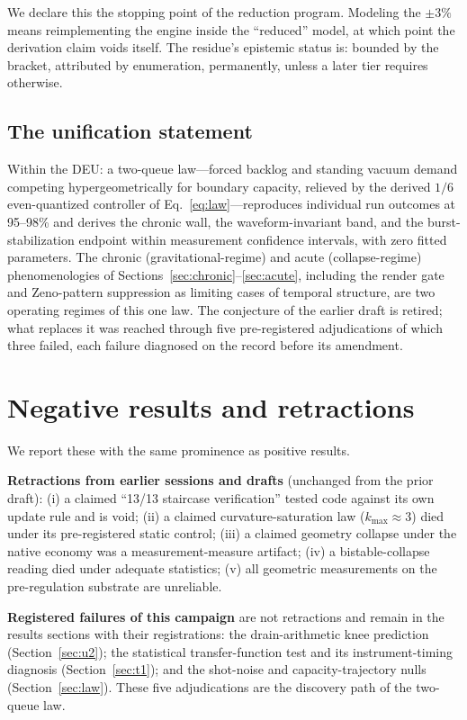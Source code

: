 \documentclass[11pt]{article}
\begin{document}
We declare this the stopping point of the reduction program. Modeling the
$\pm3\%$ means reimplementing the engine inside the ``reduced'' model, at
which point the derivation claim voids itself. The residue's epistemic status
is: bounded by the bracket, attributed by enumeration, permanently, unless a
later tier requires otherwise.

\subsection{The unification statement}
Within the DEU: a two-queue law---forced backlog and standing vacuum demand
competing hypergeometrically for boundary capacity, relieved by the derived
$1/6$ even-quantized controller of Eq.~\ref{eq:law}---reproduces individual
run outcomes at 95--98\% and derives the chronic wall, the waveform-invariant
band, and the burst-stabilization endpoint within measurement confidence
intervals, with zero fitted parameters. The chronic (gravitational-regime)
and acute (collapse-regime) phenomenologies of
Sections~\ref{sec:chronic}--\ref{sec:acute}, including the render gate and
Zeno-pattern suppression as limiting cases of temporal structure, are two
operating regimes of this one law. The conjecture of the earlier draft is
retired; what replaces it was reached through five pre-registered
adjudications of which three failed, each failure diagnosed on the record
before its amendment.

\section{Negative results and retractions}\label{sec:neg}
We report these with the same prominence as positive results.

\textbf{Retractions from earlier sessions and drafts} (unchanged from the
prior draft): (i) a claimed ``13/13 staircase verification'' tested code
against its own update rule and is void; (ii) a claimed curvature-saturation
law ($k_{\max}\approx3$) died under its pre-registered static control;
(iii) a claimed geometry collapse under the native economy was a
measurement-measure artifact; (iv) a bistable-collapse reading died under
adequate statistics; (v) all geometric measurements on the pre-regulation
substrate are unreliable.

\textbf{Registered failures of this campaign} are not retractions and remain
in the results sections with their registrations: the drain-arithmetic knee
prediction (Section~\ref{sec:u2}); the statistical transfer-function test and
its instrument-timing diagnosis (Section~\ref{sec:t1}); and the shot-noise and
capacity-trajectory nulls (Section~\ref{sec:law}). These five adjudications
are the discovery path of the two-queue law.
\end{document}
